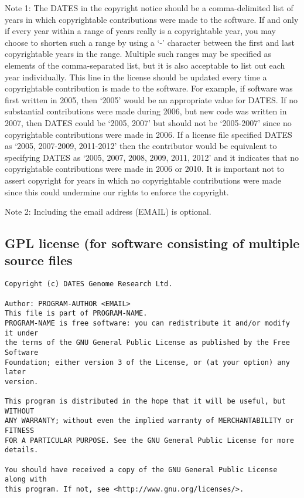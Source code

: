 \documentclass[10pt,a4paper]{article}
\begin{document}
Note 1: The DATES in the copyright notice should be a comma-delimited list of years in which 
copyrightable contributions were made to the software. If and only if every year within a range 
of years really is a copyrightable year, you may choose to shorten such a range by using a `-' 
character between the first and last copyrightable years in the range. Multiple such ranges may 
be specified as elements of the comma-separated list, but it is also acceptable to list out each 
year individually. This line in the license should be updated every time a copyrightable 
contribution is made to the software. For example, if software was first written in 2005, then 
`2005' would be an appropriate value for DATES. If no substantial contributions were made 
during 2006, but new code was written in 2007, then DATES could be `2005, 2007' but should 
not be `2005-2007' since no copyrightable contributions were made in 2006. If a license file 
specified DATES as `2005, 2007-2009, 2011-2012' then the contributor would be equivalent to 
specifying DATES as `2005, 2007, 2008, 2009, 2011, 2012' and it indicates that no copyrightable 
contributions were made in 2006 or 2010. It is important not to assert copyright for years in 
which no copyrightable contributions were made since this could undermine our rights to 
enforce the copyright. 
 
Note 2: Including the email address (EMAIL) is optional. 

\subsection{GPL license (for software consisting of multiple source files}

\begin{boilerplate}
\begin{verbatim}
Copyright (c) DATES Genome Research Ltd. 
 
Author: PROGRAM-AUTHOR <EMAIL> 
This file is part of PROGRAM-NAME. 
PROGRAM-NAME is free software: you can redistribute it and/or modify it under 
the terms of the GNU General Public License as published by the Free Software 
Foundation; either version 3 of the License, or (at your option) any later 
version. 
 
This program is distributed in the hope that it will be useful, but WITHOUT 
ANY WARRANTY; without even the implied warranty of MERCHANTABILITY or FITNESS 
FOR A PARTICULAR PURPOSE. See the GNU General Public License for more 
details. 
 
You should have received a copy of the GNU General Public License along with 
this program. If not, see <http://www.gnu.org/licenses/>. 
\end{verbatim}
\end{boilerplate}
\end{document}

